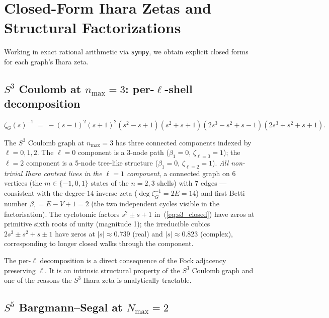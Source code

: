 \documentclass[11pt]{article}
\begin{document}
\section{Closed-Form Ihara Zetas and Structural Factorizations}
\label{sec:closed_forms}

Working in exact rational arithmetic via \texttt{sympy}, we obtain
explicit closed forms for each graph's Ihara zeta.

\subsection{$S^3$ Coulomb at $n_{\max}=3$: per-$\ell$-shell
decomposition}

\begin{equation}
\zeta_G(s)^{-1} \;=\; -(s-1)^2 (s+1)^2 (s^2 - s + 1)(s^2 + s + 1)
    (2s^3 - s^2 + s - 1)(2s^3 + s^2 + s + 1).
\label{eq:s3_closed}
\end{equation}

The $S^3$ Coulomb graph at $n_{\max}=3$ has three connected components
indexed by $\ell=0,1,2$.  The $\ell=0$ component is a 3-node path
($\beta_1=0$, $\zeta_{\ell=0}=1$); the $\ell=2$ component is a 5-node
tree-like structure ($\beta_1=0$, $\zeta_{\ell=2}=1$).  \emph{All
non-trivial Ihara content lives in the $\ell=1$ component}, a connected
graph on $6$ vertices (the $m\in\{-1,0,1\}$ states of the $n=2,3$ shells)
with $7$ edges --- consistent with the degree-$14$ inverse zeta
($\deg\zeta_G^{-1} = 2E = 14$) and first Betti number
$\beta_1 = E - V + 1 = 2$ (the two independent cycles visible in the
factorisation).  The cyclotomic
factors $s^2 \pm s + 1$ in~(\ref{eq:s3_closed}) have zeros at primitive
sixth roots of unity (magnitude 1); the irreducible cubics
$2s^3 \pm s^2 + s \pm 1$ have
zeros at $|s|\approx 0.739$ (real) and $|s|\approx 0.823$ (complex),
corresponding to longer closed walks through the component.

The per-$\ell$ decomposition is a direct consequence of the Fock
adjacency preserving $\ell$.  It is an intrinsic structural property
of the $S^3$ Coulomb graph and one of the reasons the $S^3$ Ihara zeta
is analytically tractable.

\subsection{$S^5$ Bargmann--Segal at $N_{\max}=2$}
\end{document}
